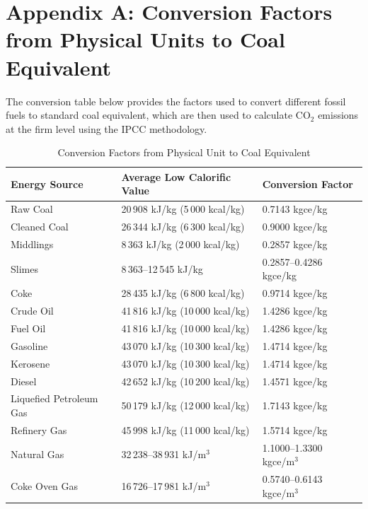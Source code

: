 \documentclass[11pt,a4paper]{article}
\begin{document}
\appendix
\renewcommand{\thetable}{A.\arabic{table}}
\setcounter{table}{0}

\section{Appendix A: Conversion Factors from Physical Units to Coal Equivalent}

The conversion table below provides the factors used to convert different fossil fuels to standard coal equivalent, which are then used to calculate CO$_2$ emissions at the firm level using the IPCC methodology.

\begin{table}[htbp]
\centering
\caption{Conversion Factors from Physical Unit to Coal Equivalent}
\label{tab:conversion}
\begin{tabular}{lll}
\toprule
Energy Source & Average Low Calorific Value & Conversion Factor \\
\midrule
Raw Coal                    & 20\,908 kJ/kg (5\,000 kcal/kg) & 0.7143 kgce/kg \\
Cleaned Coal                & 26\,344 kJ/kg (6\,300 kcal/kg) & 0.9000 kgce/kg \\
Middlings                   & 8\,363 kJ/kg (2\,000 kcal/kg)  & 0.2857 kgce/kg \\
Slimes                      & 8\,363--12\,545 kJ/kg           & 0.2857--0.4286 kgce/kg \\
Coke                        & 28\,435 kJ/kg (6\,800 kcal/kg) & 0.9714 kgce/kg \\
Crude Oil                   & 41\,816 kJ/kg (10\,000 kcal/kg) & 1.4286 kgce/kg \\
Fuel Oil                    & 41\,816 kJ/kg (10\,000 kcal/kg) & 1.4286 kgce/kg \\
Gasoline                    & 43\,070 kJ/kg (10\,300 kcal/kg) & 1.4714 kgce/kg \\
Kerosene                    & 43\,070 kJ/kg (10\,300 kcal/kg) & 1.4714 kgce/kg \\
Diesel                      & 42\,652 kJ/kg (10\,200 kcal/kg) & 1.4571 kgce/kg \\
Liquefied Petroleum Gas     & 50\,179 kJ/kg (12\,000 kcal/kg) & 1.7143 kgce/kg \\
Refinery Gas                & 45\,998 kJ/kg (11\,000 kcal/kg) & 1.5714 kgce/kg \\
Natural Gas                 & 32\,238--38\,931 kJ/m$^3$       & 1.1000--1.3300 kgce/m$^3$ \\
Coke Oven Gas               & 16\,726--17\,981 kJ/m$^3$       & 0.5740--0.6143 kgce/m$^3$ \\

\end{tabular}
\end{table}
\end{document}
